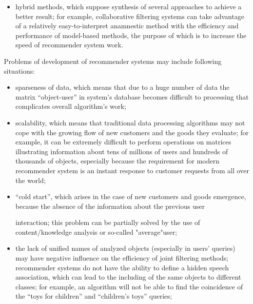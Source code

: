 \documentclass[10pt, a4paper]{article}
\begin{document}
\begin{multicols}{2}
\begin{itemize}[itemsep=0pt, parsep=0pt]
\item hybrid methods, which suppose synthesis of several approaches to achieve a better result; for example,
collaborative filtering systems can take advantage
of a relatively easy-to-interpret anamnestic method
with the efficiency and performance of model-based
methods, the purpose of which is to increase the speed
of recommender system work.

\end{itemize}

\vspace{-0,8em}
Problems of development of recommender systems may
include following situations:
\vspace{-1em}

\begin{itemize}[itemsep=0pt, parsep=0pt]

\item sparseness of data, which means that due to a huge number of data the matrix “object-user” in system’s database becomes difficult to processing that
complicates overall algorithm’s work;

\item scalability, which means that traditional data
processing algorithms may not cope with the growing
flow of new customers and the goods they evaluate;
for example, it can be extremely difficult to perform
operations on matrices illustrating information about
tens of millions of users and hundreds of thousands
of objects, especially because the requirement for
modern recommender system is an instant response
to customer requests from all over the world;

\item “cold start”, which arises in the case of new
customers and goods emergence, because the
absence of the information about the previous user

\columnbreak

\noindent interaction; this problem can be partially solved by
the use of content/knowledge analysis or so-called
"average"user;

\item the lack of unified names of analyzed objects
(especially in users’ queries) may have negative
influence on the efficiency of joint filtering methods;
recommender systems do not have the ability to define
a hidden speech association, which can lead to the
including of the same objects to different classes; for
example, an algorithm will not be able to find the
coincidence of the “toys for children” and “children’s
toys” queries;


\end{itemize}
\end{multicols}
\end{document}
